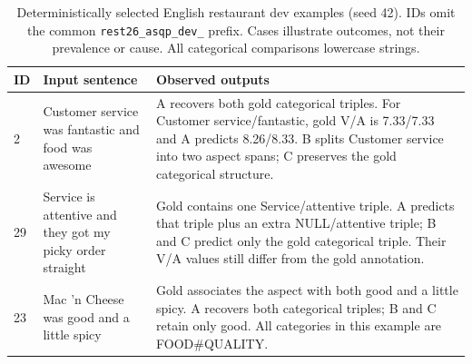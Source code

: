 \begin{table}[t]
\centering\small
\caption{Deterministically selected English restaurant dev examples (seed 42). IDs omit the common \texttt{rest26\_asqp\_dev\_} prefix. Cases illustrate outcomes, not their prevalence or cause. All categorical comparisons lowercase strings.}
\label{tab:cases}
\begin{tabular}{lp{5.1cm}p{10.0cm}}
\toprule
ID & Input sentence & Observed outputs \\
\midrule
2 & Customer service was fantastic and food was awesome & A recovers both gold categorical triples. For Customer service/fantastic, gold V/A is 7.33/7.33 and A predicts 8.26/8.33. B splits Customer service into two aspect spans; C preserves the gold categorical structure. \\
29 & Service is attentive and they got my picky order straight & Gold contains one Service/attentive triple. A predicts that triple plus an extra NULL/attentive triple; B and C predict only the gold categorical triple. Their V/A values still differ from the gold annotation. \\
23 & Mac 'n Cheese was good and a little spicy & Gold associates the aspect with both good and a little spicy. A recovers both categorical triples; B and C retain only good. All categories in this example are FOOD\#QUALITY. \\
\bottomrule
\end{tabular}
\end{table}
